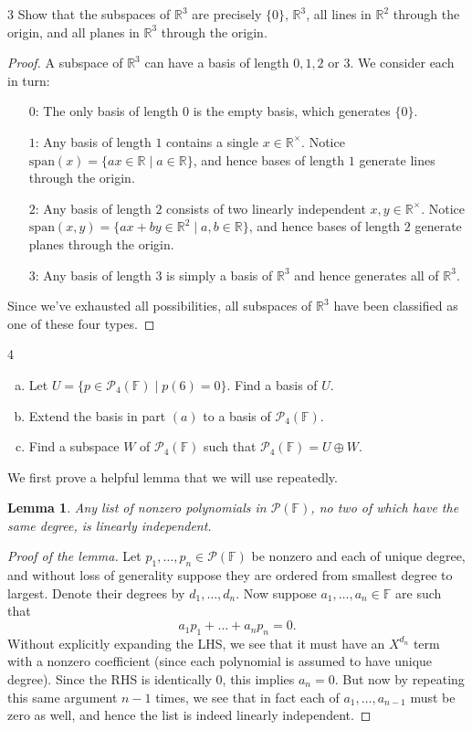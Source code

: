 \documentclass{extarticle}
\newenvironment{problem}[1]{\begin{prob*}{#1}{}}{\end{prob*}}
\newtheorem{lemma}[thm]{Lemma}
\newcommand{\R}{\mathbb{R}}
\newcommand{\F}{\mathbb{F}}
\newcommand{\Span}{\mathrm{span}}
\begin{document}
\begin{problem}{3}
Show that the subspaces of $\R^3$ are precisely $\{0\}$, $\R^3$, all lines in $\R^2$ through the origin, and all planes in $\R^3$ through the origin.
\end{problem}
\begin{proof}
A subspace of $\R^3$ can have a basis of length $0,1,2$ or $3$.  We consider each in turn:
\begin{itemize}
\item[$0$:] The only basis of length $0$ is the empty basis, which generates $\{0\}$.
\item[$1$:] Any basis of length $1$ contains a single $x\in\R^\times$.  Notice $\Span(x)=\{ax\in\R\mid a\in\R\}$, and hence bases of length $1$ generate lines through the origin.
\item[$2$:] Any basis of length $2$ consists of two linearly independent $x,y\in\R^\times$.  Notice $\Span(x,y)=\{ax + by\in\R^2\mid a,b\in\R\}$, and hence bases of length $2$ generate planes through the origin.
\item[$3$:] Any basis of length $3$ is simply a basis of $\R^3$ and hence generates all of $\R^3$.
\end{itemize}
Since we've exhausted all possibilities, all subspaces of $\R^3$ have been classified as one of these four types.
\end{proof}

\begin{problem}{4}
\begin{enumerate}[(a)]
\item Let $U=\{p\in\mathcal{P}_4(\F)\mid p(6) = 0\}$.  Find a basis of $U$.
\item Extend the basis in part $(a)$ to a basis of $\mathcal{P}_4(\F)$.
\item Find a subspace $W$ of $\mathcal{P}_4(\F)$ such that $\mathcal{P}_4(\F)=U\oplus W$.
\end{enumerate}
\end{problem}
\noindent We first prove a helpful lemma that we will use repeatedly.
\begin{lemma}
Any list of nonzero polynomials in $\mathcal{P}(\F)$, no two of which have the same degree, is linearly independent.
\end{lemma}
\begin{proof}[Proof of the lemma]
Let $p_1,\dots, p_n\in\mathcal{P}(\F)$ be nonzero and each of unique degree, and without loss of generality suppose they are ordered from smallest degree to largest.  Denote their degrees by $d_1,\dots,d_n$.  Now suppose $a_1,\dots, a_n\in\F$ are such that
\begin{equation*}
a_1p_1 + \dots + a_np_n = 0.
\end{equation*}
Without explicitly expanding the LHS, we see that it must have an $X^{d_n}$ term with a nonzero coefficient (since each polynomial is assumed to have unique degree).  Since the RHS is identically $0$, this implies $a_n=0$.  But now by repeating this same argument $n-1$ times, we see that in fact each of $a_1,\dots,a_{n-1}$ must be zero as well, and hence the list is indeed linearly independent.
\end{proof}
\end{document}
